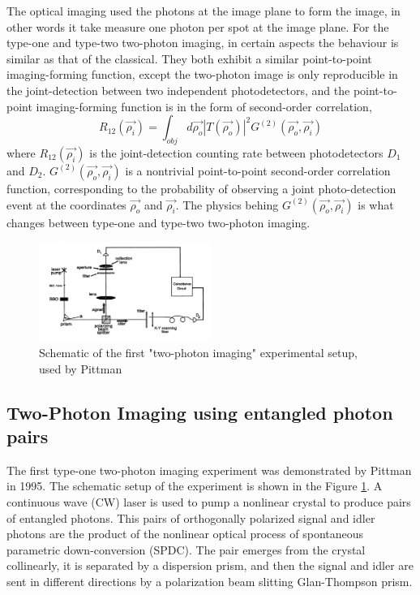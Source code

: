 The optical imaging used the photons at the image plane to form the image, in other 
words it take measure one photon per spot at the image plane. For the type-one and type-two
two-photon imaging, in certain aspects the behaviour is similar as that of the classical.
They both exhibit a similar point-to-point imaging-forming function, except the 
two-photon image is only reproducible in the joint-detection between two independent photodetectors,
and the point-to-point imaging-forming function is in the form of second-order correlation,
\begin{equation}
R_{12}(\vec{\rho_i})=\int_{obj} d\vec{\rho_o} |T(\vec{\rho_o})|^2 G^{(2)}(\vec{\rho_o},\vec{\rho_i})
\end{equation}
where $R_{12}(\vec{\rho_i})$ is the joint-detection counting rate between photodetectors $D_1$ and $D_2$.
$G^{(2)}(\vec{\rho_o},\vec{\rho_i})$ is a nontrivial point-to-point second-order correlation
function, corresponding to the probability of observing a joint photo-detection event
at the coordinates $\vec{\rho_o}$ and $\vec{\rho_i}$. The physics behing $G^{(2)}(\vec{\rho_o},\vec{\rho_i})$
is what changes between type-one and type-two two-photon imaging.
\begin{figure}[h]
\centering
\includegraphics[width=0.5\textwidth]{Figures/pittman.png}
\caption{Schematic of the first "two-photon imaging" experimental setup, used by Pittman\cite{pittman}} 
\label{fig:pittman}
\end{figure}

\subsection{Two-Photon Imaging using entangled photon pairs}
The first type-one two-photon imaging experiment was demonstrated by Pittman
in 1995\cite{pittman}. The schematic setup of the experiment is shown in the 
Figure \ref{fig:pittman}. A continuous wave (CW) laser is used to pump a nonlinear 
crystal to produce pairs of entangled photons. 
This pairs of orthogonally polarized signal and idler photons are the product
of the nonlinear optical process of spontaneous parametric down-conversion (SPDC).
The pair emerges from the crystal collinearly, it is separated by a dispersion prism, 
and then the signal and idler are sent in different directions by a polarization
beam slitting Glan-Thompson prism. 

